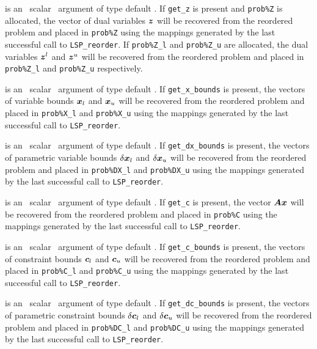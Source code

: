 \documentclass{galahad}
\newcommand{\packagename}{LSP}
\begin{document}
\begin{description}
is an \optional\ scalar \intentin\ argument of type default \logical. 
If {\tt get\_z} is present and {\tt prob\%Z} is allocated, 
the vector of dual variables ${\bm{z}}$
will be recovered from  the reordered problem and placed in {\tt prob\%Z} 
using the mappings generated by the last successful call to 
{\tt \packagename\_reorder}. If {\tt prob\%Z\_l} and {\tt prob\%Z\_u} 
are allocated, the dual variables
${\bm{z}}^l$ and ${\bm{z}}^u$ will be recovered from  the reordered problem and 
placed in {\tt prob\%Z\_l} and {\tt prob\%Z\_u} respectively.
 
is an \optional\ scalar \intentin\ argument of type default \logical. 
If {\tt get\_x\_bounds} is present, 
the vectors of variable bounds ${\bm{x}}_l$ and ${\bm{x}}_u$
will be recovered from  the reordered problem and placed in {\tt prob\%X\_l} 
and {\tt prob\%X\_u} using the mappings generated by the last successful 
call to {\tt \packagename\_reorder}. 
 
is an \optional\ scalar \intentin\ argument of type default \logical. 
If {\tt get\_dx\_bounds} is present, 
the vectors of parametric variable bounds $\delta {\bm{x}}_l$ and 
$\delta {\bm{x}}_u$
will be recovered from  the reordered problem and placed in {\tt prob\%DX\_l} 
and {\tt prob\%DX\_u} using the mappings generated by the last successful 
call to {\tt \packagename\_reorder}. 

is an \optional\ scalar \intentin\ argument of type default \logical. 
If {\tt get\_c} is present, the vector ${\bm{A}} {\bm{x}}$ 
will be recovered from  the reordered problem and placed in {\tt prob\%C} 
using the mappings generated by the last successful call to 
{\tt \packagename\_reorder}. 
 
is an \optional\ scalar \intentin\ argument of type default \logical. 
If {\tt get\_c\_bounds} is present, 
the vectors of constraint bounds ${\bm{c}}_l$ and 
${\bm{c}}_u$
will be recovered from  the reordered problem and placed in {\tt prob\%C\_l} 
and {\tt prob\%C\_u} using the mappings generated by the last successful 
call to {\tt \packagename\_reorder}. 
 
is an \optional\ scalar \intentin\ argument of type default \logical. 
If {\tt get\_dc\_bounds} is present, 
the vectors of parametric constraint bounds $\delta {\bm{c}}_l$ and $\delta {\bm{c}}_u$
will be recovered from  the reordered problem and placed in {\tt prob\%DC\_l} 
and {\tt prob\%DC\_u} using the mappings generated by the last successful 
call to {\tt \packagename\_reorder}. 
 

\end{description}
\end{document}
